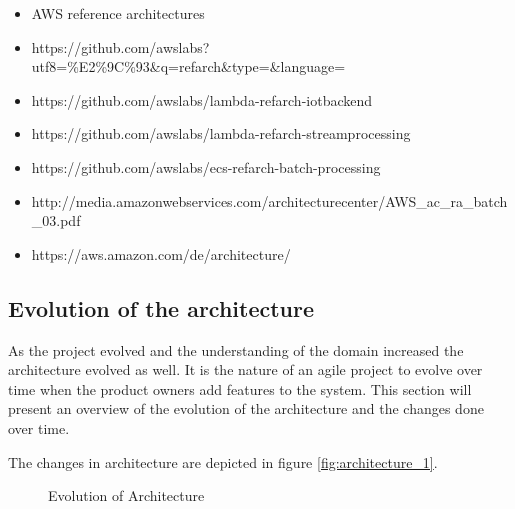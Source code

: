 \begin{itemize}
\tightlist
\item
  AWS reference architectures
\item
  https://github.com/awslabs?utf8=\%E2\%9C\%93\&q=refarch\&type=\&language=
\item
  https://github.com/awslabs/lambda-refarch-iotbackend
\item
  https://github.com/awslabs/lambda-refarch-streamprocessing
\item
  https://github.com/awslabs/ecs-refarch-batch-processing
\item
  http://media.amazonwebservices.com/architecturecenter/AWS\_ac\_ra\_batch\_03.pdf
\item
  https://aws.amazon.com/de/architecture/
\end{itemize}

\subsection{Evolution of the architecture}\label{evolution-of-the-architecture}

As the project evolved and the understanding of the domain increased the
architecture evolved as well. It is the nature of an agile project to
evolve over time when the product owners add features to the system.
This section will present an overview of the evolution of the
architecture and the changes done over time.

The changes in architecture are depicted in figure \ref{fig:architecture_1}.

\begin{figure}
	\caption{Evolution of Architecture}
	\label{fig:evol_architecture}
\end{figure}

